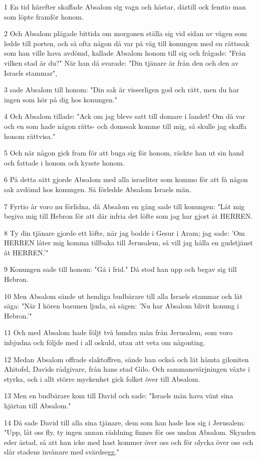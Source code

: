 \par 1 En tid härefter skaffade Absalom sig vagn och hästar, därtill ock femtio man som löpte framför honom.
\par 2 Och Absalom plägade bittida om morgonen ställa sig vid sidan av vägen som ledde till porten, och så ofta någon då var på väg till konungen med en rättssak som han ville hava avdömd, kallade Absalom honom till sig och frågade: "Från vilken stad är du?" När han då svarade: "Din tjänare är från den och den av Israels stammar",
\par 3 sade Absalom till honom: "Din sak är visserligen god och rätt, men du har ingen som hör på dig hos konungen."
\par 4 Och Absalom tillade: "Ack om jag bleve satt till domare i landet! Om då var och en som hade någon rätts- och domssak komme till mig, så skulle jag skaffa honom rättvisa."
\par 5 Och när någon gick fram för att buga sig för honom, räckte han ut sin hand och fattade i honom och kysste honom.
\par 6 På detta sätt gjorde Absalom med alla israeliter som kommo för att få någon sak avdömd hos konungen. Så förledde Absalom Israels män.
\par 7 Fyrtio år voro nu förlidna, då Absalom en gång sade till konungen: "Låt mig begiva mig till Hebron för att där infria det löfte som jag har gjort åt HERREN.
\par 8 Ty din tjänare gjorde ett löfte, när jag bodde i Gesur i Aram; jag sade: 'Om HERREN låter mig komma tillbaka till Jerusalem, så vill jag hålla en gudstjänst åt HERREN.'"
\par 9 Konungen sade till honom: "Gå i frid." Då stod han upp och begav sig till Hebron.
\par 10 Men Absalom sände ut hemliga budbärare till alla Israels stammar och lät säga: "När I hören basunen ljuda, så sägen: 'Nu har Absalom blivit konung i Hebron.'"
\par 11 Och med Absalom hade följt två hundra män från Jerusalem, som voro inbjudna och följde med i all oskuld, utan att veta om någonting.
\par 12 Medan Absalom offrade slaktoffren, sände han också och lät hämta giloniten Ahitofel, Davids rådgivare, från hans stad Gilo. Och sammansvärjningen växte i styrka, och i allt större myckenhet gick folket över till Absalom.
\par 13 Men en budbärare kom till David och sade: "Israels män hava vänt sina hjärtan till Absalom."
\par 14 Då sade David till alla sina tjänare, dem som han hade hos sig i Jerusalem: "Upp, låt oss fly, ty ingen annan räddning finnes för oss undan Absalom. Skynden eder åstad, så att han icke med hast kommer över oss och för olycka över oss och slår stadens invånare med svärdsegg."
